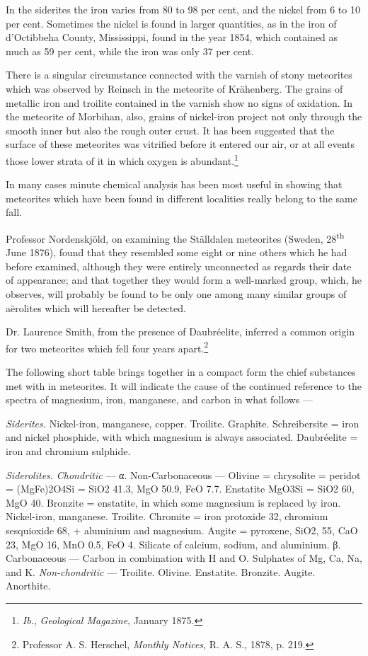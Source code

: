 \documentclass[a4paper, 12pt, oneside, polutonikogreek, english]{article}
\begin{document}
In the siderites the iron varies from 80 to 98 per cent, and the nickel from 6 to 10 per cent. Sometimes the nickel is found in larger quantities, as in the iron of d'Octibbeha County, Mississippi, found in the year 1854, which contained as much as 59 per cent, while the iron was only 37 per cent.

There is a singular circumstance connected with the varnish of stony meteorites which was observed by Reinsch in the meteorite of Krähenberg. The grains of metallic iron and troilite contained in the varnish show no signs of oxidation. In the meteorite of Morbihan, also, grains of nickel-iron project not only through the smooth inner but also the rough outer crust. It has been suggested that the surface of these meteorites was vitrified before it entered our air, or at all events those lower strata of it in which oxygen is abundant.\footnote{\emph{Ib.}, \emph{Geological Magazine}, January 1875.}

In many cases minute chemical analysis has been most useful in showing that meteorites which have been found in different localities really belong to the same fall.

Professor Nordenskjöld, on examining the Ställdalen meteorites (Sweden, 28\textsuperscript{th} June 1876), found that they resembled some eight or nine others which he had before examined, although they were entirely unconnected as regards their date of appearance; and that together they would form a well-marked group, which, he observes, will probably be found to be only one among many similar groups of aërolites which will hereafter be detected.

Dr. Laurence Smith, from the presence of Daubréelite, inferred a common origin for two meteorites which fell four years apart.\footnote{Professor A. S. Herschel, \emph{Monthly Notices}, R. A. S., 1878, p. 219.}

The following short table brings together in a compact form the chief substances met with in meteorites. It will indicate the cause of the continued reference to the spectra of magnesium, iron, manganese, and carbon in what follows ---

\emph{Siderites.} 
Nickel-iron, manganese, copper. 
Troilite. Graphite. 
Schreibersite = iron and nickel phosphide, with which magnesium is always associated. 
Daubréelite = iron and chromium sulphide. 

\emph{Siderolites.} 
\emph{Chondritic} --- 
α. Non-Carbonaceous --- 
Olivine = chrysolite = peridot = (MgFe)2O4Si = SiO2 41.3, MgO 50.9, FeO 7.7. 
Enstatite MgO3Si = SiO2 60, MgO 40. 
Bronzite = enstatite, in which some magnesium is replaced by iron. 
Nickel-iron, manganese. 
Troilite. 
Chromite = iron protoxide 32, chromium sesquioxide 68, + aluminium and magnesium. 
Augite = pyroxene, SiO2, 55, CaO 23, MgO 16, MnO 0.5, FeO 4. 
Silicate of calcium, sodium, and aluminium. 
β. Carbonaceous --- 
Carbon in combination with H and O. 
Sulphates of Mg, Ca, Na, and K. 
\emph{Non-chondritic} --- 
Troilite. 
Olivine. 
Enstatite. 
Bronzite. 
Augite. 
Anorthite. 
\clearpage
\end{document}
